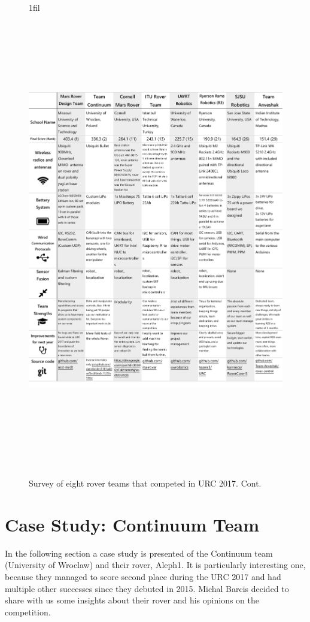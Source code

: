 \documentclass[runningheads,a4paper]{llncs}
\makeatletter
\newcommand*{\centerfloat}{%
  \parindent \z@
  \leftskip \z@ \@plus 1fil \@minus \textwidth
  \rightskip\leftskip
  \parfillskip \z@skip}
\makeatother
\begin{document}
\begin{figure}
\centerfloat
\includegraphics[height=20cm]{surveyP2}
\label{fig:S2}
\caption{Survey of eight rover teams that competed in URC 2017. Cont.}
\end{figure}

\section{Case Study: Continuum Team}\label{continuumcase}

In the following section a case study is presented of the Continuum team (University of Wroclaw) and their rover, Aleph1. It is particularly interesting one, because they managed to score second place during the URC 2017 and had multiple other successes since they debuted in 2015. Michal Barcis decided to share with us some insights about their rover and his opinions on the competition. 
\end{document}
